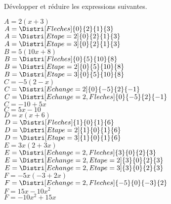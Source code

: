 \begin{corrige}
    Développer et réduire les expressions suivantes.
    \begin{multicols}{2}    
    \begin{itemize}
        \def\item{}
        \begin{spacing}{1.2}
            \item $A= 2(x+3)$\\
            {\red             
            $A=\Distri[Fleches]{0}{2}{1}{3}$\\
            $A=\Distri[Etape=2]{0}{2}{1}{3}$\\
            $A=\Distri[Etape=3]{0}{2}{1}{3}$\\
            }
            \item $B= 5(10x+8)$\\
            {\red 
            $B=\Distri[Fleches]{0}{5}{10}{8}$\\
            $B=\Distri[Etape=2]{0}{5}{10}{8}$\\
            $B=\Distri[Etape=3]{0}{5}{10}{8}$\\
            }
            \item $C= -5(2-x)$\\
            {\red 
            $C=\Distri[Echange=2]{0}{-5}{2}{-1}$\\
            $C=\Distri[Echange=2,Fleches]{0}{-5}{2}{-1}$\\
            $C=-10+5x$\\
            $C=5x-10$\\
            }
            \item $D= x(x+6)$\\
            {\red 
            $D=\Distri[Fleches]{1}{0}{1}{6}$\\
            $D=\Distri[Etape=2]{1}{0}{1}{6}$\\
            $D=\Distri[Etape=3]{1}{0}{1}{6}$\\
            }
            \item $E= 3x(2+3x)$\\
            {\red             
            $E=\Distri[Echange=2,Fleches]{3}{0}{2}{3}$\\
            $E=\Distri[Echange=2,Etape=2]{3}{0}{2}{3}$\\
            $E=\Distri[Echange=2,Etape=3]{3}{0}{2}{3}$\\
            }
            \item $F= -5x(-3+2x)$\\
            {\red             
            $F=\Distri[Echange=2,Fleches]{-5}{0}{-3}{2}$\\
            $F=15x-10x^2$\\
            $F=-10x^2+15x$\\
            }
        \end{spacing}
    \end{itemize}
    \end{multicols}
\end{corrige}

